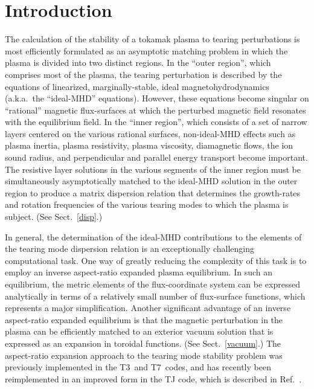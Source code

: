 \documentclass[12pt,prb,aps]{revtex4-1}
\begin{document}
\section{Introduction} 
The calculation of the stability of a tokamak plasma to tearing perturbations is most efficiently formulated as  an asymptotic
matching problem in which the  plasma is  divided into two distinct regions.\cite{fkr}  In the ``outer region'', which comprises most
of the plasma, the tearing perturbation is described by the equations of linearized, marginally-stable, ideal magnetohydrodynamics (a.k.a.\ the ``ideal-MHD'' equations). 
However, these equations become singular on   ``rational'' magnetic flux-surfaces at which the perturbed magnetic field resonates with the equilibrium field. In the ``inner region'', which
consists of a set of narrow layers centered on the various rational surfaces, non-ideal-MHD effects such as plasma inertia, plasma resistivity, 
plasma viscosity,  diamagnetic flows, the ion sound radius,  and perpendicular and parallel energy transport become important.\cite{ara,hkm,fw,cole,diff}  The resistive layer
solutions in the various segments of the inner region must be simultaneously asymptotically matched to the ideal-MHD solution in the outer region to produce a matrix 
dispersion relation that determines the growth-rates and  rotation frequencies of the various tearing modes to which the plasma is subject.\cite{con0,cht} (See Sect.~\ref{disp}.)

In general, the  determination of the ideal-MHD contributions to the elements of the  tearing mode dispersion relation is an exceptionally challenging computational task.\cite{connor,nish,gal,pletz,pletz1,tokuda,brennan,ham,ham1,ham2,am1,am2,am3,aglas,aglas1,aglas2}
One way of greatly reducing the complexity of this task is to employ an inverse aspect-ratio expanded plasma equilibrium.\cite{greene,gim,inverse} In such an equilibrium,
the metric elements of the flux-coordinate system can be expressed analytically in terms of a relatively small number of  flux-surface functions,
which represents a major simplification.\cite{con0} Another significant advantage of an inverse aspect-ratio expanded equilibrium is that the magnetic perturbation in the plasma can be efficiently 
matched to an exterior vacuum solution  that is expressed as an expansion in toroidal functions.\cite{am1} (See Sect.~\ref{vacuum}.) The aspect-ratio expansion approach to the tearing mode stability problem  was previously implemented in the T3\,\cite{connor} and T7\,\cite{am1} codes, and has recently been reimplemented in an improved form in the TJ code,
which is described in Ref.~.
\end{document}

